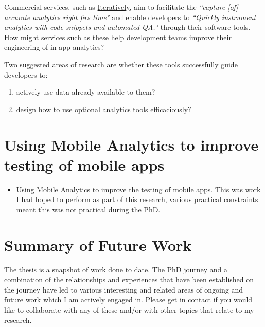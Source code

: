 Commercial services, such as \href{http://iterative.ly}{Iteratively}, aim to facilitate the \emph{``capture [of] accurate analytics right firs time"} and enable developers to \emph{``Quickly instrument analytics with code snippets and automated QA."} through their software tools. How might services such as these help development teams improve their engineering of in-app analytics? 

Two suggested areas of research are whether these tools successfully guide developers to:
\begingroup
\renewcommand{\theenumi}{\alph{enumi}}
\begin{enumerate}
    \item actively use data already available to them?
    \item design how to use optional analytics tools efficaciously?
\end{enumerate}
\endgroup


\section{Using Mobile Analytics to improve testing of mobile apps}
\begin{itemize}
    \item Using Mobile Analytics to improve the testing of mobile apps. This was work I had hoped to perform as part of this research, various practical constraints meant this was not practical during the PhD.
\end{itemize}

\section{Summary of Future Work}
The thesis is a snapshot of work done to date. The PhD journey and a combination of the relationships and experiences that have been established on the journey have led to various interesting and related areas of ongoing and future work which I am actively engaged in. Please get in contact if you would like to collaborate with any of these and/or with other topics that relate to my research.

